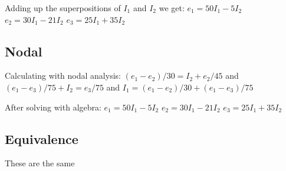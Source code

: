 \documentclass{article}
\begin{document}
\vspace*{1em}
\noindent Adding up the superpositions of $I_1$ and $I_2$ we get:\newline
$e_1=50I_1-5I_2$\newline
$e_2=30I_1-21I_2$\newline
$e_3=25I_1+35I_2$

\subsection*{Nodal}
Calculating with nodal analysis:\newline
$(e_1-e_2)/30=I_2+e_2/45$ and $(e_1-e_3)/75+I_2=e_3/75$ and \newline
$I_1=(e_1-e_2)/30+(e_1-e_3)/75$

\vspace*{1em}
\noindent After solving with algebra:\newline
$e_1=50I_1-5I_2$\newline
$e_2=30I_1-21I_2$\newline
$e_3=25I_1+35I_2$

\subsection*{Equivalence}
These are the same
\end{document}
